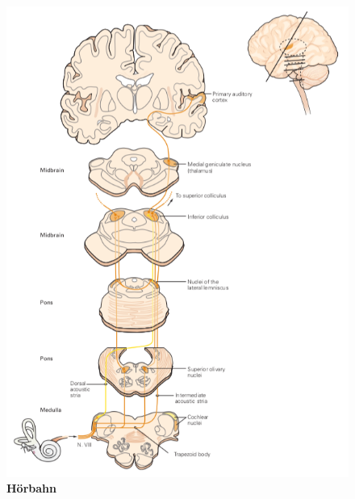 \documentclass[12pt,a4paper,pdftex]{article}
\begin{document}
\begin{figure}
    \centering
    \includegraphics{pictures/auditory/hoerbahn_pathway.png}
    \caption[Hörbahn]{\textbf{Hörbahn}}
    \label{fig:hoerbahn_pathway}
\end{figure}
\end{document}

